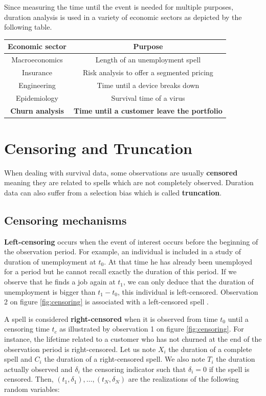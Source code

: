 \documentclass[
]{book}
\begin{document}
Since measuring the time until the event is needed for multiple purposes, duration analysis is used in a variety of economic sectors as depicted by the following table.

\begin{longtable}[]{@{}cc@{}}
\toprule
Economic sector & Purpose \\
\midrule
\endhead
Macroeconomics & Length of an unemployment spell \\
Insurance & Risk analysis to offer a segmented pricing \\
Engineering & Time until a device breaks down \\
Epidemiology & Survival time of a virus \\
\textbf{Churn analysis} & \textbf{Time until a customer leave the portfolio} \\
\bottomrule
\end{longtable}

\hypertarget{censoring-and-truncation}{%
\section{Censoring and Truncation}\label{censoring-and-truncation}}

When dealing with survival data, some observations are usually \textbf{censored} meaning they are related to spells which are not completely observed. Duration data can also suffer from a selection bias which is called \textbf{truncation}.

\hypertarget{censoring-mechanisms}{%
\subsection{Censoring mechanisms}\label{censoring-mechanisms}}

\textbf{Left-censoring} occurs when the event of interest occurs before the beginning of the observation period. For example, an individual is included in a study of duration of unemployment at \(t_0\). At that time he has already been unemployed for a period but he cannot recall exactly the duration of this period. If we observe that he finds a job again at \(t_1\), we can only deduce that the duration of unemployment is bigger than \(t_1-t_0\), this individual is left-censored. Observation 2 on figure \ref{fig:censoring} is associated with a left-censored spell \citep{LIU_SCOR}.

A spell is considered \textbf{right-censored} when it is observed from time \(t_0\) until a censoring time \(t_c\) as illustrated by observation 1 on figure \ref{fig:censoring}. For instance, the lifetime related to a customer who has not churned at the end of the observation period is right-censored. Let us note \(X_i\) the duration of a complete spell and \(C_i\) the duration of a right-censored spell. We also note \(T_i\) the duration actually observed and \(\delta_i\) the censoring indicator such that \(\delta_i = 0\) if the spell is censored. Then, \((t_1, \delta_1),\dots,(t_N, \delta_N)\) are the realizations of the following random variables:
\end{document}

